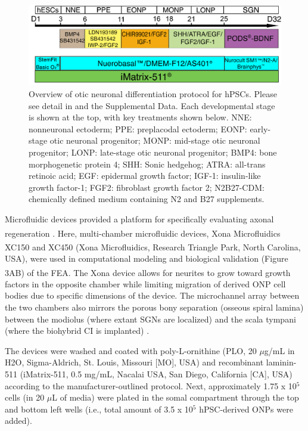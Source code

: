 \documentclass[review]{elsarticle}
\begin{document}
\begin{figure}
	\begin{center}
		\includegraphics[width=12cm]{Fig_3.jpg}
	\end{center}
	\caption{Overview of otic neuronal differentiation protocol for hPSCs. Please see detail in \cite{Heuer2021, Chang2020,Matsuoka2017g, Matsuoka2017} and the Supplemental Data. Each developmental stage is shown at the top, with key treatments shown below. NNE: nonneuronal ectoderm; PPE: preplacodal ectoderm; EONP: early-stage otic neuronal progenitor; MONP: mid-stage otic neuronal progenitor; LONP: late-stage otic neuronal progenitor; BMP4: bone morphogenetic protein 4; SHH: Sonic hedgehog; ATRA: all-trans retinoic acid; EGF: epidermal growth factor; IGF-1: insulin-like growth factor-1; FGF2: fibroblast growth factor 2; N2B27-CDM: chemically defined medium containing N2 and B27 supplements.}
\end{figure}

\indent Microfluidic devices provided a platform for specifically evaluating axonal regeneration \cite{Al-Ali2017a}. Here, multi-chamber microfluidic devices, Xona\textsuperscript{\texttrademark} Microfluidics XC150 and XC450 (Xona\textsuperscript{\texttrademark} Microfluidics, Research Triangle Park, North Carolina, USA), were used in computational modeling and biological validation (Figure 3A\textendash B) of the FEA. The Xona \textsuperscript{\texttrademark} device allows for neurites to grow toward growth factors in the opposite chamber while limiting migration of derived ONP cell bodies due to specific dimensions of the device. The microchannel array between the two chambers also mirrors the porous bony separation (osseous spiral lamina) between the modiolus (where extant SGNs are localized) and the scala tympani (where the biohybrid CI is implanted) \cite{Tuncel2005,Kucuk1991a}.


\indent The devices were washed and coated with poly-L-ornithine (PLO, 20 $\mu$g/mL in H\lowercase{2}O, Sigma-Aldrich, St. Louis, Missouri [MO], USA) and recombinant laminin-511 (iMatrix-511, 0.5 mg/mL, Nacalai USA, San Diego, California [CA], USA) according to the manufacturer-outlined protocol. Next, approximately 1.75  x 10$^{5}$ cells (in 20 $\mu$L of media) were plated in the somal compartment through the top and bottom left wells (i.e., total amount of 3.5 x 10$^{5}$ hPSC-derived ONPs were added). 
\end{document}
